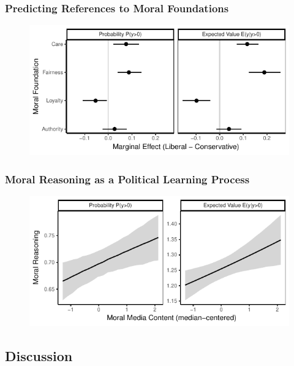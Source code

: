 \begin{frame}%
  \frametitle{Predicting References to Moral Foundations}
  \begin{figure}[ht]\centering
    \includegraphics[width=\textwidth]{fig/tobit_ideol}
  \end{figure}
\end{frame}


\begin{frame}%
  \frametitle{Moral Reasoning as a Political Learning Process}
  \begin{figure}[ht]\centering
    \includegraphics[width=\textwidth]{fig/tobit_media}
  \end{figure}
\end{frame}

\subsection{Discussion}

